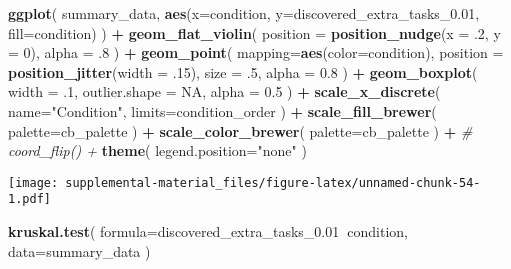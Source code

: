 \documentclass[]{book}
\newenvironment{Shaded}{\begin{snugshade}}{\end{snugshade}}
\newcommand{\CommentTok}[1]{\textcolor[rgb]{0.56,0.35,0.01}{\textit{#1}}}
\newcommand{\DataTypeTok}[1]{\textcolor[rgb]{0.13,0.29,0.53}{#1}}
\newcommand{\DecValTok}[1]{\textcolor[rgb]{0.00,0.00,0.81}{#1}}
\newcommand{\FloatTok}[1]{\textcolor[rgb]{0.00,0.00,0.81}{#1}}
\newcommand{\KeywordTok}[1]{\textcolor[rgb]{0.13,0.29,0.53}{\textbf{#1}}}
\newcommand{\NormalTok}[1]{#1}
\newcommand{\OperatorTok}[1]{\textcolor[rgb]{0.81,0.36,0.00}{\textbf{#1}}}
\newcommand{\OtherTok}[1]{\textcolor[rgb]{0.56,0.35,0.01}{#1}}
\newcommand{\StringTok}[1]{\textcolor[rgb]{0.31,0.60,0.02}{#1}}
\begin{document}
\begin{Shaded}
\begin{Highlighting}[]
\KeywordTok{ggplot}\NormalTok{(}
\NormalTok{    summary_data,}
    \KeywordTok{aes}\NormalTok{(}\DataTypeTok{x=}\NormalTok{condition, }\DataTypeTok{y=}\NormalTok{discovered_extra_tasks_}\FloatTok{0.01}\NormalTok{, }\DataTypeTok{fill=}\NormalTok{condition)}
\NormalTok{  ) }\OperatorTok{+}
\StringTok{  }\KeywordTok{geom_flat_violin}\NormalTok{(}
    \DataTypeTok{position =} \KeywordTok{position_nudge}\NormalTok{(}\DataTypeTok{x =} \FloatTok{.2}\NormalTok{, }\DataTypeTok{y =} \DecValTok{0}\NormalTok{),}
    \DataTypeTok{alpha =} \FloatTok{.8}
\NormalTok{  ) }\OperatorTok{+}
\StringTok{  }\KeywordTok{geom_point}\NormalTok{(}
    \DataTypeTok{mapping=}\KeywordTok{aes}\NormalTok{(}\DataTypeTok{color=}\NormalTok{condition),}
    \DataTypeTok{position =} \KeywordTok{position_jitter}\NormalTok{(}\DataTypeTok{width =} \FloatTok{.15}\NormalTok{),}
    \DataTypeTok{size =} \FloatTok{.5}\NormalTok{,}
    \DataTypeTok{alpha =} \FloatTok{0.8}
\NormalTok{  ) }\OperatorTok{+}
\StringTok{  }\KeywordTok{geom_boxplot}\NormalTok{(}
    \DataTypeTok{width =} \FloatTok{.1}\NormalTok{,}
    \DataTypeTok{outlier.shape =} \OtherTok{NA}\NormalTok{,}
    \DataTypeTok{alpha =} \FloatTok{0.5}
\NormalTok{  ) }\OperatorTok{+}
\StringTok{  }\KeywordTok{scale_x_discrete}\NormalTok{(}
    \DataTypeTok{name=}\StringTok{"Condition"}\NormalTok{,}
    \DataTypeTok{limits=}\NormalTok{condition_order}
\NormalTok{  ) }\OperatorTok{+}
\StringTok{  }\KeywordTok{scale_fill_brewer}\NormalTok{(}
    \DataTypeTok{palette=}\NormalTok{cb_palette}
\NormalTok{  ) }\OperatorTok{+}
\StringTok{  }\KeywordTok{scale_color_brewer}\NormalTok{(}
    \DataTypeTok{palette=}\NormalTok{cb_palette}
\NormalTok{  ) }\OperatorTok{+}
\StringTok{  }\CommentTok{# coord_flip() +}
\StringTok{  }\KeywordTok{theme}\NormalTok{(}
    \DataTypeTok{legend.position=}\StringTok{"none"}
\NormalTok{  )}
\end{Highlighting}
\end{Shaded}

\texttt{[image: supplemental-material\_files/figure-latex/unnamed-chunk-54-1.pdf]}

\begin{Shaded}
\begin{Highlighting}[]
\KeywordTok{kruskal.test}\NormalTok{(}
  \DataTypeTok{formula=}\NormalTok{discovered_extra_tasks_}\FloatTok{0.01}\OperatorTok{~}\NormalTok{condition,}
  \DataTypeTok{data=}\NormalTok{summary_data}
\NormalTok{)}
\end{Highlighting}
\end{Shaded}
\end{document}
